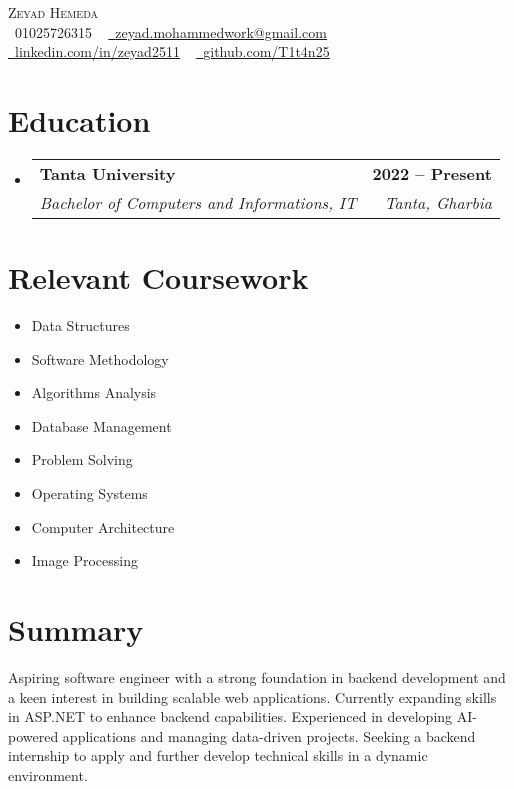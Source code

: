 \documentclass[letterpaper,11pt]{article}
\makeatletter
\newcommand{\resumeSubheading}[4]{
  \vspace{-2pt}\item
    \begin{tabular*}{1.0\textwidth}[t]{l@{\extracolsep{\fill}}r}
      \textbf{#1} & \textbf{\small #2} \\
      \textit{\small#3} & \textit{\small #4} \\
    \end{tabular*}\vspace{-7pt}
}
\newcommand{\resumeSubHeadingListStart}{\begin{itemize}[leftmargin=0.0in, label={}]}
\newcommand{\resumeSubHeadingListEnd}{\end{itemize}}
\makeatother
\begin{document}
\begin{center}
    {\Huge \scshape Zeyad Hemeda} \\ \vspace{1pt}
    \small \raisebox{-0.1\height}\faPhone\ 01025726315 ~ \href{mailto:zeyad.mohammedwork@gmail.com}{\raisebox{-0.2\height}\faEnvelope\  \underline{zeyad.mohammedwork@gmail.com}} ~ 
    \href{https://linkedin.com/in/zeyad2511}{\raisebox{-0.2\height}\faLinkedin\ \underline{linkedin.com/in/zeyad2511}}  ~
    \href{https://github.com/T1t4n25}{\raisebox{-0.2\height}\faGithub\ \underline{github.com/T1t4n25}}
    \vspace{-8pt}
\end{center}

\section{Education}
  \resumeSubHeadingListStart
    \resumeSubheading
      {Tanta University}{2022 -- Present}
      {Bachelor of Computers and Informations, IT}{Tanta, Gharbia}
  \resumeSubHeadingListEnd

\section{Relevant Coursework}
    \begin{multicols}{4}
        \begin{itemize}[itemsep=-5pt, parsep=3pt]
            \item\small Data Structures
            \item Software Methodology
            \item Algorithms Analysis
            \item Database Management
            \item Problem Solving
            \item Operating Systems
            \item Computer Architecture
            \item Image Processing
        \end{itemize}
    \end{multicols}
    \vspace*{2.0\multicolsep}

\section{Summary}
\small{
Aspiring software engineer with a strong foundation in backend development and a keen interest in building scalable web applications. Currently expanding skills in ASP.NET to enhance backend capabilities. Experienced in developing AI-powered applications and managing data-driven projects. Seeking a backend internship to apply and further develop technical skills in a dynamic environment.
}
\vspace{-10pt}
\end{document}
